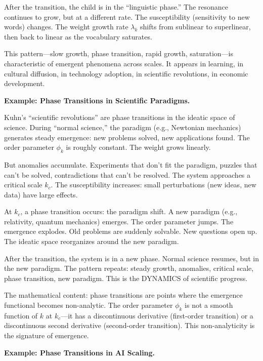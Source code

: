\begin{interpretation}
After the transition, the child is in the ``linguistic phase.'' The resonance
continues to grow, but at a different rate. The susceptibility (sensitivity to
new words) changes. The weight growth rate $\lambda_k$ shifts from sublinear
to superlinear, then back to linear as the vocabulary saturates.

This pattern---slow growth, phase transition, rapid growth, saturation---is
characteristic of emergent phenomena across scales. It appears in learning,
in cultural diffusion, in technology adoption, in scientific revolutions, in
economic development.

\textbf{Example: Phase Transitions in Scientific Paradigms.}

Kuhn's ``scientific revolutions'' are phase transitions in the ideatic space of
science. During ``normal science,'' the paradigm (e.g., Newtonian mechanics)
generates steady emergence: new problems solved, new applications found. The
order parameter $\phi_k$ is roughly constant. The weight grows linearly.

But anomalies accumulate. Experiments that don't fit the paradigm, puzzles that
can't be solved, contradictions that can't be resolved. The system approaches
a critical scale $k_c$. The susceptibility increases: small perturbations (new
ideas, new data) have large effects.

At $k_c$, a phase transition occurs: the paradigm shift. A new paradigm (e.g.,
relativity, quantum mechanics) emerges. The order parameter jumps. The emergence
explodes. Old problems are suddenly solvable. New questions open up. The ideatic
space reorganizes around the new paradigm.

After the transition, the system is in a new phase. Normal science resumes, but
in the new paradigm. The pattern repeats: steady growth, anomalies, critical
scale, phase transition, new paradigm. This is the DYNAMICS of scientific progress.

The mathematical content: phase transitions are points where the emergence
functional becomes non-analytic. The order parameter $\phi_k$ is not a smooth
function of $k$ at $k_c$---it has a discontinuous derivative (first-order transition)
or a discontinuous second derivative (second-order transition). This non-analyticity
is the signature of emergence.

\textbf{Example: Phase Transitions in AI Scaling.}


\end{interpretation}
